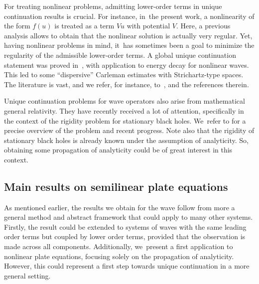 \documentclass[10pt]{amsart}
\theoremstyle{definition}
\begin{document}
For treating nonlinear problems, admitting lower-order terms in unique continuation results is crucial. For instance, in~the present work, a nonlinearity of the form $f(u)$ is treated as a term $V u$ with potential $V$. Here, a previous analysis allows to obtain that the nonlinear solution is actually very regular. Yet, having nonlinear problems in mind, it~has sometimes been a goal to minimize the regularity of the admissible lower-order terms. A global unique continuation statement was proved in~\cite{Ruiz:92}, with application to energy decay for nonlinear waves. This led to some ``dispersive'' Carleman estimates with Strichartz-type spaces. The literature is vast, and we refer, for instance, to~\cite{KRS:87,DDSF:05, KT:05}, and the references therein.

Unique continuation problems for wave operators also arise from mathematical general relativity. They have recently received a lot of attention, specifically in the context of the rigidity problem for stationary black holes. We~refer to \cite{IK:15} for a precise overview of the problem and recent progress. Note also that the rigidity of stationary black holes is already known under the assumption of analyticity. So, obtaining some propagation of analyticity could be of great interest in this context.

\subsection{Main results on semilinear plate equations}\label{s:plateintro}

As mentioned earlier, the results we obtain for the wave follow from more a general method and abstract framework that could apply to many other systems. Firstly, the result could be extended to systems of waves with the same leading order terms but coupled by lower order terms, provided that the observation is made across all components. Additionally, we~present a first application to nonlinear plate equations, focusing solely on the propagation of analyticity. However, this could represent a first step towards unique continuation in a more general setting.
\end{document}
